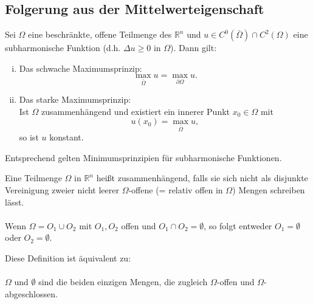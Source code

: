 \subsection{Folgerung aus der Mittelwerteigenschaft} 
\label{sub:folgerung_aus_der_mittelwerteigenschaft}
\begin{satz}[Maximumsprinzipien]
	Sei $\Omega$ eine beschränkte, offene Teilmenge des $\mathbb{R}^n$ und $u \in C^0(\bar{\Omega}) \cap C^2(\Omega)$ eine subharmonische Funktion (d.h. $ \Delta u \geq 0$ in $\Omega$). Dann gilt:
	\begin{enumerate}[(i)]
		\item Das schwache Maximumsprinzip:
		\[
			\max_{\bar{\Omega}} u = \max_{\partial \Omega}u.
		\]
		\item Das starke Maximumsprinzip: \\
		Ist $\Omega$ zusammenhängend und existiert ein innerer Punkt $x_0 \in \Omega$ mit \[
			u(x_0) = \max_{ \bar{\Omega}} u,
		\]so ist $u$ konstant.
	\end{enumerate}
\end{satz}
\begin{bemerkung}
	Entsprechend gelten Minimumsprinzipien für subharmonische Funktionen.
\end{bemerkung}
\begin{definition*}
	Eine Teilmenge $\Omega$ in $\mathbb{R}^n$ heißt zusammenhängend,
	falls sie sich nicht als disjunkte Vereinigung zweier nicht leerer $\Omega$-offene (= relativ offen in $\Omega$) Mengen schreiben lässt. \\
	\\
	Wenn $\Omega = O_1 \cup O_2$ mit $O_1,O_2$ offen und $O_1 \cap O_2 = \emptyset$, so folgt entweder $O_1 = \emptyset$ oder $O_2 = \emptyset$.
\end{definition*}
\begin{bemerkung}
	Diese Definition ist äquivalent zu: \\
	\\
	$\Omega$ und $\emptyset$ sind die beiden einzigen Mengen, die zugleich $\Omega$-offen und $\Omega$-abgeschlossen.
\end{bemerkung}

